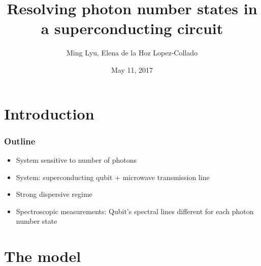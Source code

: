 \documentclass[xcolor=dvipsnames,hyperref={CJKbookmarks=true}]{beamer}
\title[Nature 445, 515-518]{Resolving photon number states in a superconducting circuit}
\author[Ming, Elena]{Ming Lyu, Elena de la Hoz Lopez-Collado}
\institute[Princeton]{Final projects for ELE456 at Princeton}
\date{May 11, 2017}
\begin{document}
\begin{frame}
\titlepage
\end{frame}
\begin{frame}
    \tableofcontents
\end{frame}

\section{Introduction} 
    


\begin{frame}
\frametitle{Outline}
\begin{itemize}
\item System sensitive to  number of photons
\vspace{0.3cm}
\item System: superconducting qubit +  microwave transmission line
\vspace{0.3cm}
\item Strong dispersive regime
\vspace{0.3cm}
\item Spectroscopic measurements: Qubit's spectral lines different for each photon number state
\end{itemize}
\end{frame}


\section{The model}
\end{document}
